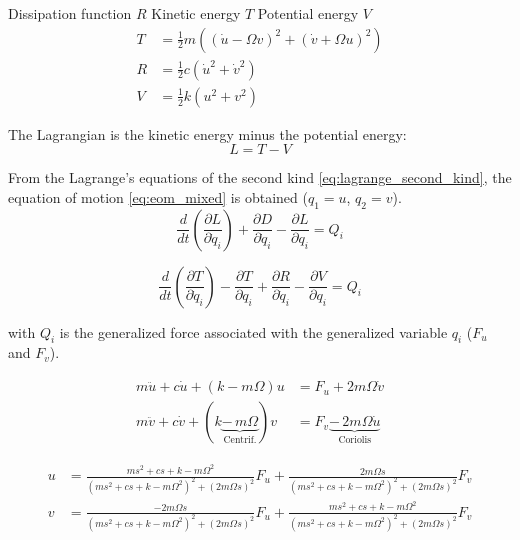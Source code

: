 \documentclass{ISMA_USD2020}
\begin{document}
Dissipation function \(R\)
Kinetic energy \(T\)
Potential energy \(V\)
\begin{subequations}
\label{eq:energy_inertial_frame}
  \begin{align}
    T & = \frac{1}{2} m \left( \left( \dot{u} - \Omega v \right)^2 + \left( \dot{v} + \Omega u \right)^2 \right) \\
    R & = \frac{1}{2} c \left( \dot{u}^2 + \dot{v}^2 \right) \\
    V & = \frac{1}{2} k \left( u^2 + v^2 \right)
  \end{align}
\end{subequations}

The Lagrangian is the kinetic energy minus the potential energy:
\begin{equation}
\label{eq:lagrangian_inertial_frame}
L = T - V
\end{equation}

From the Lagrange's equations of the second kind \eqref{eq:lagrange_second_kind}, the equation of motion \eqref{eq:eom_mixed} is obtained (\(q_1 = u\), \(q_2 = v\)).
\begin{equation}
  \frac{d}{dt} \left( \frac{\partial L}{\partial \dot{q}_i} \right) + \frac{\partial D}{\partial \dot{q}_i} - \frac{\partial L}{\partial q_i} = Q_i
\end{equation}

\begin{equation}
  \frac{d}{dt} \left( \frac{\partial T}{\partial \dot{q}_i} \right) - \frac{\partial T}{\partial q_i} + \frac{\partial R}{\partial \dot{q}_i} - \frac{\partial V}{\partial q_i} = Q_i
\end{equation}

with \(Q_i\) is the generalized force associated with the generalized variable \(q_i\) (\(F_u\) and \(F_v\)).

\begin{subequations}
  \begin{align}
    m \ddot{u} + c \dot{u} + ( k - m \Omega ) u &= F_u + 2 m \Omega \dot{v} \\
    m \ddot{v} + c \dot{v} + ( k \underbrace{-\,m \Omega}_{\text{Centrif.}} ) v &= F_v \underbrace{-\,2 m \Omega \dot{u}}_{\text{Coriolis}}
  \end{align}
\end{subequations}

\begin{subequations}
  \begin{align}
    u &= \frac{ms^2 + cs + k - m \Omega^2}{\left( m s^2 + cs + k - m \Omega^2 \right)^2 + \left( 2 m \Omega s \right)^2} F_u +  \frac{2 m \Omega s}{\left( m s^2 + cs + k - m \Omega^2 \right)^2 + \left( 2 m \Omega s \right)^2} F_v \\
    v &= \frac{-2 m \Omega s}{\left( m s^2 + cs + k - m \Omega^2 \right)^2 + \left( 2 m \Omega s \right)^2} F_u +  \frac{ms^2 + cs + k - m \Omega^2}{\left( m s^2 + cs + k - m \Omega^2 \right)^2 + \left( 2 m \Omega s \right)^2} F_v
  \end{align}
\end{subequations}
\end{document}
